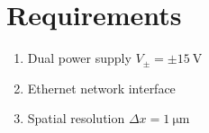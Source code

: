 \section{Requirements}

\begin{enumerate}
    \item Dual power supply $V_\pm=\pm\SI{15}{\volt}$
    \item Ethernet network interface
    \item Spatial resolution $\Delta x=\SI{1}{\micro\meter}$
\end{enumerate}
